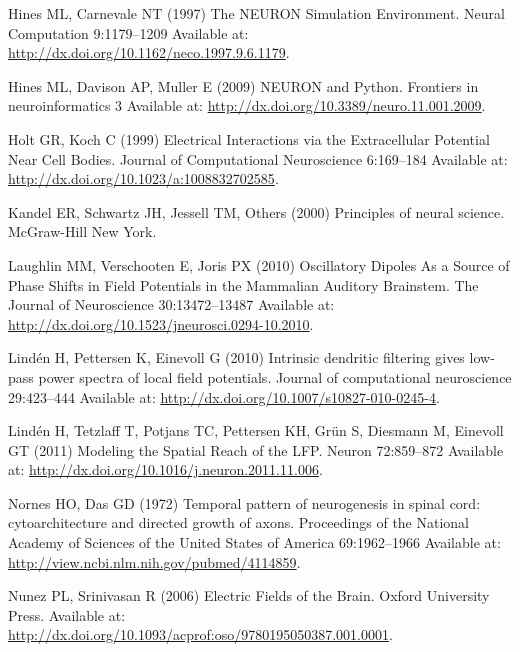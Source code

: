 \documentclass[]{article}
\begin{document}
Hines ML, Carnevale NT (1997) The NEURON Simulation Environment. Neural
Computation 9:1179--1209 Available at:
\url{http://dx.doi.org/10.1162/neco.1997.9.6.1179}.

Hines ML, Davison AP, Muller E (2009) NEURON and Python. Frontiers in
neuroinformatics 3 Available at:
\url{http://dx.doi.org/10.3389/neuro.11.001.2009}.

Holt GR, Koch C (1999) Electrical Interactions via the Extracellular
Potential Near Cell Bodies. Journal of Computational Neuroscience
6:169--184 Available at:
\url{http://dx.doi.org/10.1023/a:1008832702585}.

Kandel ER, Schwartz JH, Jessell TM, Others (2000) Principles of neural
science. McGraw-Hill New York.

Laughlin MM, Verschooten E, Joris PX (2010) Oscillatory Dipoles As a
Source of Phase Shifts in Field Potentials in the Mammalian Auditory
Brainstem. The Journal of Neuroscience 30:13472--13487 Available at:
\url{http://dx.doi.org/10.1523/jneurosci.0294-10.2010}.

Lindén H, Pettersen K, Einevoll G (2010) Intrinsic dendritic filtering
gives low-pass power spectra of local field potentials. Journal of
computational neuroscience 29:423--444 Available at:
\url{http://dx.doi.org/10.1007/s10827-010-0245-4}.

Lindén H, Tetzlaff T, Potjans TC, Pettersen KH, Grün S, Diesmann M,
Einevoll GT (2011) Modeling the Spatial Reach of the LFP. Neuron
72:859--872 Available at:
\url{http://dx.doi.org/10.1016/j.neuron.2011.11.006}.

Nornes HO, Das GD (1972) Temporal pattern of neurogenesis in spinal
cord: cytoarchitecture and directed growth of axons. Proceedings of the
National Academy of Sciences of the United States of America
69:1962--1966 Available at:
\url{http://view.ncbi.nlm.nih.gov/pubmed/4114859}.

Nunez PL, Srinivasan R (2006) Electric Fields of the Brain. Oxford
University Press. Available at:
\url{http://dx.doi.org/10.1093/acprof:oso/9780195050387.001.0001}.
\end{document}
